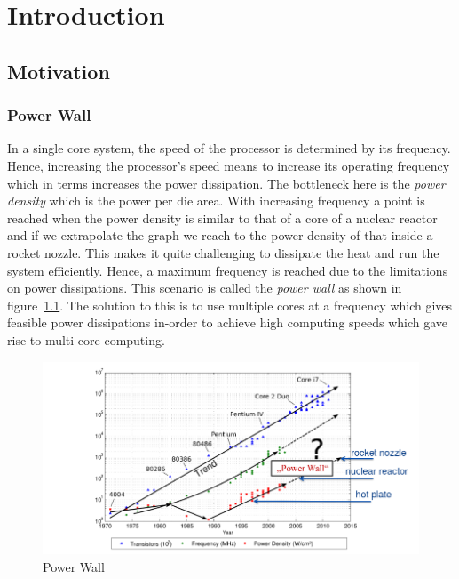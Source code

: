 \documentclass{listhesis}
\begin{document}
\chapter{Introduction}
\section{Motivation}
\subsection{Power Wall}
In a single core system, the speed of the processor is determined by its frequency. Hence, increasing the processor's speed means to increase its operating frequency which in terms increases the power dissipation. The bottleneck here is the \textit{power density} which is the power per die area. With increasing frequency a point is reached when the power density is similar to that of a core of a nuclear reactor and if we extrapolate the graph we reach to the power density of that inside a rocket nozzle. This makes it quite challenging to dissipate the heat and run the system efficiently. Hence, a maximum frequency is reached due to the limitations on power dissipations. This scenario is called the \textit{power wall} as shown in figure~\ref{fig:powerwall}. The solution to this is to use multiple cores at a frequency which gives feasible power dissipations in-order to achieve high computing speeds which gave rise to multi-core computing.\\
\begin{figure}[h!]
  \includegraphics[width=\linewidth]{powerwall.png}
  \centering
  \caption{Power Wall~\cite{chipmulticore}}
  \label{fig:powerwall}
\end{figure}
\end{document}
